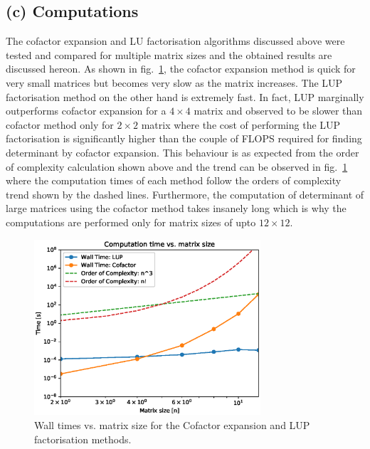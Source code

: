 \documentclass[11pt, oneside]{article}
\begin{document}
\subsection*{(c) Computations}
The cofactor expansion and LU factorisation algorithms discussed above were tested and compared for multiple matrix sizes and the obtained results are discussed hereon. As shown in fig.~\ref{fig:1}, the cofactor expansion method is quick for very small matrices but becomes very slow as the matrix increases. The LUP factorisation method on the other hand is extremely fast. In fact, LUP marginally outperforms cofactor expansion for a $4\times4$ matrix and observed to be slower than cofactor method only for $2\times2$ matrix where the cost of performing the LUP factorisation is significantly higher than the couple of FLOPS required for finding determinant by cofactor expansion. This behaviour is as expected from the order of complexity calculation shown above and the trend can be observed in fig.~\ref{fig:1} where the computation times of each method follow the orders of complexity trend shown by the dashed lines. Furthermore, the computation of determinant of large matrices using the cofactor method takes insanely long which is why the computations are performed only for matrix sizes of upto $12\times12$.
  \begin{figure}[h]
        \centering
        \includegraphics[width=0.75\textwidth]{figure/Figure_1.eps}
        \caption{Wall times vs. matrix size for the Cofactor expansion and LUP factorisation methods.}
        \label{fig:1}
  \end{figure}
\end{document}
